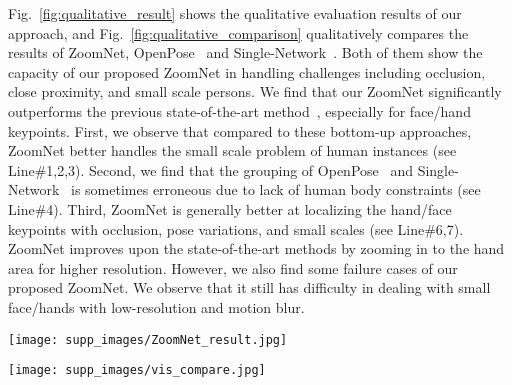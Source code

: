 \documentclass[runningheads]{llncs}
\begin{document}
	Fig.~\ref{fig:qualitative_result} shows the qualitative evaluation results of our approach, and Fig.~\ref{fig:qualitative_comparison} qualitatively compares the results of ZoomNet, OpenPose~\cite{cao2018openpose} and Single-Network~\cite{hidalgo2019single}. Both of them show the capacity of our proposed ZoomNet in handling challenges including occlusion, close proximity, and small scale persons. We find that our ZoomNet significantly outperforms the previous state-of-the-art method~\cite{hidalgo2019single}, especially for face/hand keypoints. First, we observe that compared to these bottom-up approaches, ZoomNet better handles the small scale problem of human instances (see Line\#1,2,3). Second, we find that the grouping of OpenPose~\cite{cao2018openpose} and Single-Network~\cite{hidalgo2019single} is sometimes erroneous due to lack of human body constraints (see Line\#4). Third, ZoomNet is generally better at localizing the hand/face keypoints with occlusion, pose variations, and small scales (see Line\#6,7). ZoomNet improves upon the state-of-the-art methods by zooming in to the hand area for higher resolution. However, we also find some failure cases of our proposed ZoomNet. We observe that it still has difficulty in dealing with small face/hands with low-resolution and motion blur. 
	
	\begin{figure*}[tb]
		\centering
		\texttt{[image: supp\_images/ZoomNet\_result.jpg]}
		\caption{Qualitative evaluation results of our approach in handling challenges including occlusion, close proximity, and small scale persons. 
		}
		\label{fig:qualitative_result}
	\end{figure*}
	
	
	\begin{figure*}[tb]
		\centering
		\texttt{[image: supp\_images/vis\_compare.jpg]}
		\caption{Qualitative comparison between our proposed ZoomNet, OpenPose~\cite{cao2018openpose} and Single-Network~\cite{hidalgo2019single}. Our approach outperforms the state-of-the-art approaches especially on face/hand keypoints and are more robust to scale variance. 
		}
		\label{fig:qualitative_comparison}
	\end{figure*}
	
	
	
	
\end{document}
